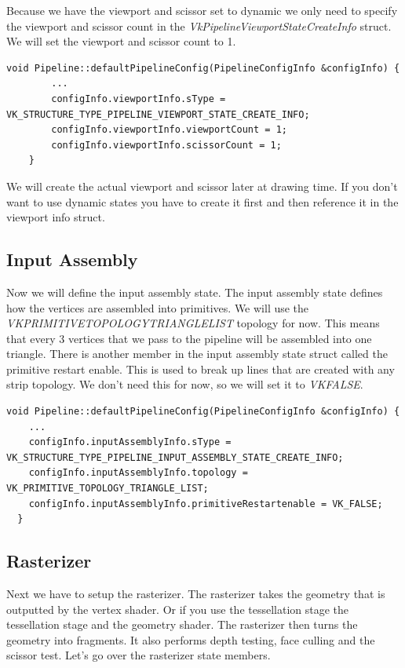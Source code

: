 \documentclass[12pt]{report} \usepackage{preamble}
\begin{document}
Because we have the viewport and scissor set to dynamic we only need to specify the viewport and scissor count in the
\textit{VkPipelineViewportStateCreateInfo} struct. We will set the viewport and scissor count to 1.

\begin{lstlisting}[Language=C++]
void Pipeline::defaultPipelineConfig(PipelineConfigInfo &configInfo) {
		...
		configInfo.viewportInfo.sType = VK_STRUCTURE_TYPE_PIPELINE_VIEWPORT_STATE_CREATE_INFO;
		configInfo.viewportInfo.viewportCount = 1;
		configInfo.viewportInfo.scissorCount = 1;
	}
\end{lstlisting}

We will create the actual viewport and scissor later at drawing time.
If you don't want to use dynamic states you have to create it first and then reference it in the viewport info struct.

\subsection{Input Assembly}

Now we will define the input assembly state. The input assembly state defines how the vertices are assembled into primitives.
We will use the \\ \textit{VK\textunderscore PRIMITIVE\textunderscore TOPOLOGY\textunderscore TRIANGLE\textunderscore LIST} topology
for now. This means that every 3 vertices that we pass to the pipeline will be assembled into one triangle. There is another
member in the input assembly state struct called the primitive restart enable. This is used to break up lines that are
created with any strip topology. We don't need this for now, so we will set it to \textit{VK\textunderscore FALSE}.

\begin{lstlisting}[Language=C++]
void Pipeline::defaultPipelineConfig(PipelineConfigInfo &configInfo) {
    ...
    configInfo.inputAssemblyInfo.sType = VK_STRUCTURE_TYPE_PIPELINE_INPUT_ASSEMBLY_STATE_CREATE_INFO;
    configInfo.inputAssemblyInfo.topology = VK_PRIMITIVE_TOPOLOGY_TRIANGLE_LIST;
    configInfo.inputAssemblyInfo.primitiveRestartenable = VK_FALSE;
  }
\end{lstlisting}

\subsection{Rasterizer}

Next we have to setup the rasterizer. The rasterizer takes the geometry that is outputted by the vertex shader.
Or if you use the tessellation stage the tessellation stage and the geometry shader. The rasterizer then turns the geometry
into fragments. It also performs depth testing, face culling and the scissor test. Let's go over the rasterizer state members.
\end{document}
